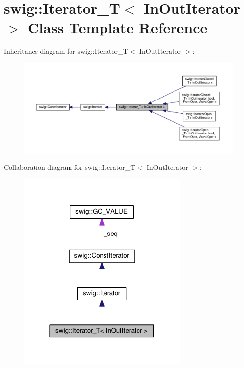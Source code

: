 \hypertarget{classswig_1_1Iterator__T}{}\section{swig\+:\+:Iterator\+\_\+T$<$ In\+Out\+Iterator $>$ Class Template Reference}
\label{classswig_1_1Iterator__T}


Inheritance diagram for swig\+:\+:Iterator\+\_\+T$<$ In\+Out\+Iterator $>$\+:
\nopagebreak
\begin{figure}[H]
\begin{center}
\leavevmode
\includegraphics[width=350pt]{classswig_1_1Iterator__T__inherit__graph}
\end{center}
\end{figure}


Collaboration diagram for swig\+:\+:Iterator\+\_\+T$<$ In\+Out\+Iterator $>$\+:
\nopagebreak
\begin{figure}[H]
\begin{center}
\leavevmode
\includegraphics[width=238pt]{classswig_1_1Iterator__T__coll__graph}
\end{center}
\end{figure}
